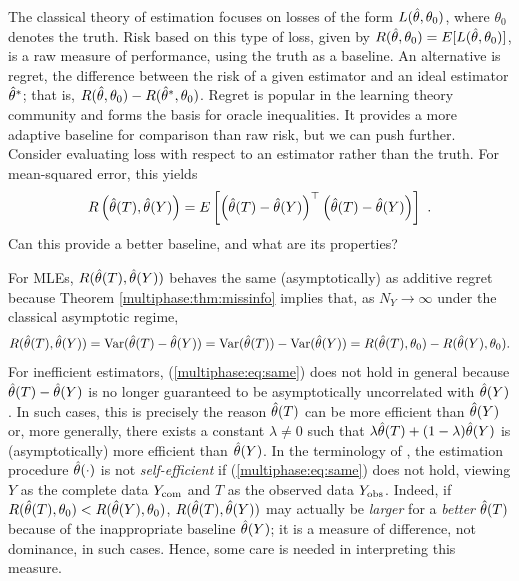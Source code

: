 The classical theory of estimation focuses on losses of the form $L(\hat{\theta}, \theta_0)$, where $\theta_0$ denotes the truth.
Risk based on this type of loss, given by $R(\hat{\theta}, \theta_0) = E[L(\hat{\theta}, \theta_0)]$, is a raw measure of performance, using the truth as a baseline.
An alternative is regret, the difference between the risk of a given estimator and an ideal estimator $\hat{\theta}^*$; that is, $R(\hat{\theta}, \theta_0) - R(\hat{\theta}^*, \theta_0)$.
Regret is popular in the learning theory community and forms the basis for oracle inequalities.
It provides a more adaptive baseline for comparison than raw risk, but we can push further.
Consider evaluating loss with respect to an estimator rather than the truth.
For mean-squared error, this yields 
\begin{equation}\label{multiphase:eq:risk}
R\left(\est(T), \est(Y)\right)=E\left[\left(\est(T) - \est(Y)\right)^{\top} \left(\est(T) - \est(Y)\right)\right]\ .
\end{equation}
Can this provide a better baseline, and what are its properties?

For MLEs, $R(\hat{\theta}(T), \hat{\theta}(Y))$ behaves the same (asymptotically) as additive regret because Theorem \ref{multiphase:thm:missinfo} implies that, as $N_Y \rightarrow \infty$ under the classical asymptotic regime,
\begin{equation}\label{multiphase:eq:same}
R(\est(T), \est(Y))=\Var(\est(T) - \est(Y))=\Var(\est(T)) -\Var(\est(Y))
=R(\est(T), \param_0)-R(\est(Y), \param_0)  .
\end{equation}
For inefficient estimators, (\ref{multiphase:eq:same}) does not hold in general because $\hat{\theta}(T) - \hat{\theta}(Y)$ is no longer guaranteed to be asymptotically uncorrelated with $\hat{\theta}(Y)$.
In such cases, this is precisely the reason $\hat{\theta}(T)$ can be more efficient than $\hat{\theta}(Y)$ or, more generally, there exists a constant $\lambda\not=0$ such that  $\lambda\hat{\theta}(T)+(1-\lambda)\hat{\theta}(Y)$ is (asymptotically) more efficient than $\hat{\theta}(Y)$.
In the terminology of \citet{Meng1994}, the estimation procedure $\hat{\theta}(\cdot)$  is not \textit{self-efficient}  if (\ref{multiphase:eq:same}) does not hold, viewing $Y$ as the complete data $Y_{\rm com}$ and $T$ as the observed data $Y_{\rm obs}$.
%
Indeed, if $R(\hat{\theta}(T), \theta_0) < R(\hat{\theta}(Y), \theta_0)$, $R(\hat{\theta}(T), \hat{\theta}(Y))$ may actually be \emph{larger} for a \emph{better} $\hat{\theta}(T)$ because of the inappropriate baseline  $\hat{\theta}(Y)$; it is a measure of difference, not dominance, in such cases.
Hence, some care is needed in interpreting this measure.
 
